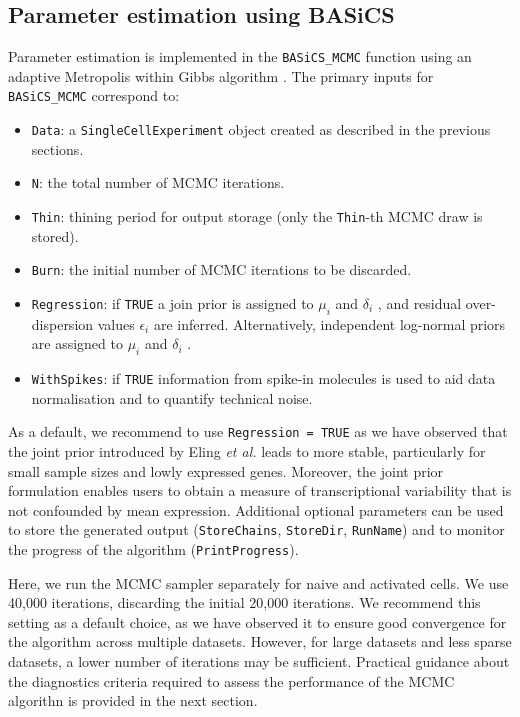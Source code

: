 \documentclass[9pt,a4paper,]{extarticle}
\begin{document}
\hypertarget{parameter-estimation-using-basics}{%
\subsection{Parameter estimation using BASiCS}\label{parameter-estimation-using-basics}}

Parameter estimation is implemented in the \texttt{BASiCS\_MCMC} function using an
adaptive Metropolis within Gibbs algorithm \citep{Roberts2009}.
The primary inputs for \texttt{BASiCS\_MCMC} correspond to:

\begin{itemize}
\item
  \texttt{Data}: a \texttt{SingleCellExperiment} object created as described in the
  previous sections.
\item
  \texttt{N}: the total number of MCMC iterations.
\item
  \texttt{Thin}: thining period for output storage
  (only the \texttt{Thin}-th MCMC draw is stored).
\item
  \texttt{Burn}: the initial number of MCMC iterations to be discarded.
\item
  \texttt{Regression}: if \texttt{TRUE} a join prior is assigned to \(\mu_i\) and \(\delta_i\)
  \citep{Eling2018}, and residual over-dispersion values \(\epsilon_i\) are inferred.
  Alternatively, independent log-normal priors are assigned to \(\mu_i\) and
  \(\delta_i\) \citep{Vallejos2016}.
\item
  \texttt{WithSpikes}: if \texttt{TRUE} information from spike-in molecules is used to aid
  data normalisation and to quantify technical noise.
\end{itemize}

As a default, we recommend to use \texttt{Regression\ =\ TRUE} as we have observed that
the joint prior introduced by Eling \emph{et al.} leads to more stable, particularly
for small sample sizes and lowly expressed genes.
Moreover, the joint prior formulation enables users to obtain a measure of
transcriptional variability that is not confounded by mean expression.
Additional optional parameters can be used to store the generated output
(\texttt{StoreChains}, \texttt{StoreDir}, \texttt{RunName}) and to monitor the progress of the
algorithm (\texttt{PrintProgress}).

Here, we run the MCMC sampler separately for naive and activated cells.
We use 40,000 iterations, discarding the initial 20,000 iterations.
We recommend this setting as a default choice, as we have observed it to
ensure good convergence for the algorithm across multiple datasets.
However, for large datasets and less sparse datasets, a lower number of
iterations may be sufficient.
Practical guidance about the diagnostics criteria required to assess the
performance of the MCMC algorithn is provided in the next section.
\end{document}
